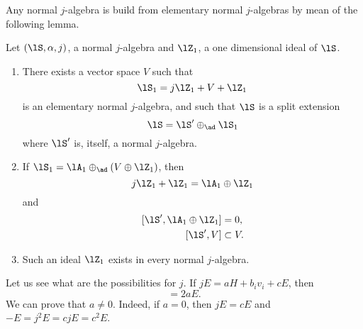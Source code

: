 Any normal $j$-algebra is build from elementary normal $j$-algebras by mean of the following lemma.
\begin{proposition}         \label{PropStructNormalJalg}
    Let $(\lS,\alpha,j)$, a normal $j$-algebra and $\lZ_1$, a one dimensional ideal of $\lS$.
    \begin{enumerate}

        \item
            There exists a vector space $V$ such that
            \begin{equation}
                \lS_1=j\lZ_1+V+\lZ_1
            \end{equation}
            is an elementary normal $j$-algebra, and such that $\lS$ is a split extension
            \begin{equation}        \label{EqDecNormale}
                \lS=\lS'\oplus_{\ad}\lS_1
            \end{equation}
            where $\lS'$ is, itself, a normal $j$-algebra.

        \item
            If $\lS_1=\lA_1\oplus_{\ad}(V\oplus\lZ_1)$, then
            \begin{equation}
                j\lZ_1+\lZ_1=\lA_1\oplus\lZ_1
            \end{equation}
            and
            \begin{equation}
                \begin{aligned}[]
                    [\lS',\lA_1\oplus\lZ_1]&=0,\\
                    [\lS',V]&\subset V.
                \end{aligned}
            \end{equation}
        \item
            Such an ideal $\lZ_1$ exists in every normal $j$-algebra.
    \end{enumerate}
\end{proposition}

Let us see what are the possibilities for $j$. If $jE=aH+b_iv_i+cE$, then
\begin{equation}
    [jE,E]=2aE.
\end{equation}
We can prove that $a\neq 0$. Indeed, if $a=0$, then $jE=cE$ and $-E=j^2E=cjE=c^2E$.

